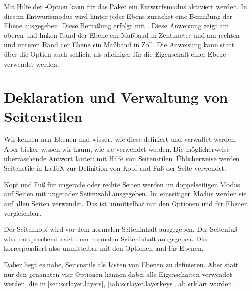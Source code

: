 \begin{Declaration}
\end{Declaration}
Mit Hilfe der \KOMAScript-Option  kann für das Paket
 ein Entwurfsmodus aktiviert werden. In diesem Entwurfsmodus
wird hinter jeder Ebene zunächst eine Bemaßung der Ebene ausgegeben. Diese
Bemaßung erfolgt mit . Diese Anweisung zeigt am
oberen und linken Rand der Ebene ein Maßband in Zentimeter und am rechten und
unteren Rand der Ebene ein Maßband in Zoll. Die Anweisung
 kann statt über die Option auch schlicht als
alleiniger  für die Eigenschaft  einer Ebene
verwendet werden.%
%
\EndIndexGroup


\section{Deklaration und Verwaltung von Seitenstilen}

\BeginIndexGroup%
%
Wir kennen nun Ebenen und wissen, wie diese definiert und verwaltet
werden. Aber bisher wissen wir kaum, wie sie verwendet werden. Die
möglicherweise überraschende Antwort lautet: mit Hilfe von
Seitenstilen. Üblicherweise werden Seitenstile in \LaTeX{} zur Definition von
Kopf und Fuß der Seite verwendet.

Kopf und Fuß für ungerade oder rechte Seiten werden im doppelseitigen Modus auf Seiten mit ungerader Seitenzahl
ausgegeben. Im einseitigen Modus werden sie auf allen Seiten verwendet. Das
ist unmittelbar mit den
Optionen 
und  für Ebenen vergleichbar.

Der Seitenkopf wird vor dem normalen Seiteninhalt
ausgegeben. Der Seitenfuß wird entsprechend nach dem normalen Seiteninhalt
ausgegeben. Dies korrespondiert also unmittelbar mit den
Optionen
 und  für Ebenen.

Daher liegt es nahe, Seitenstile als Listen von Ebenen zu definieren. Aber
statt nur den genannten vier Optionen können dabei alle Eigenschaften
verwendet werden, die in \autoref{sec:scrlayer.layers},
\autoref{tab:scrlayer.layerkeys}, ab 
erklärt wurden.

